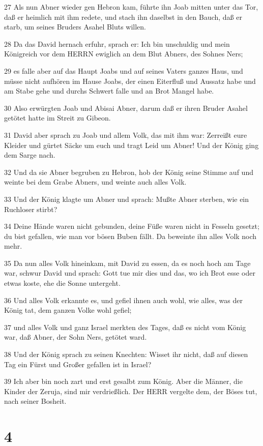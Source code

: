 \par 27 Als nun Abner wieder gen Hebron kam, führte ihn Joab mitten unter das Tor, daß er heimlich mit ihm redete, und stach ihn daselbst in den Bauch, daß er starb, um seines Bruders Asahel Bluts willen.
\par 28 Da das David hernach erfuhr, sprach er: Ich bin unschuldig und mein Königreich vor dem HERRN ewiglich an dem Blut Abners, des Sohnes Ners;
\par 29 es falle aber auf das Haupt Joabs und auf seines Vaters ganzes Haus, und müsse nicht aufhören im Hause Joabs, der einen Eiterfluß und Aussatz habe und am Stabe gehe und durchs Schwert falle und an Brot Mangel habe.
\par 30 Also erwürgten Joab und Abisai Abner, darum daß er ihren Bruder Asahel getötet hatte im Streit zu Gibeon.
\par 31 David aber sprach zu Joab und allem Volk, das mit ihm war: Zerreißt eure Kleider und gürtet Säcke um euch und tragt Leid um Abner! Und der König ging dem Sarge nach.
\par 32 Und da sie Abner begruben zu Hebron, hob der König seine Stimme auf und weinte bei dem Grabe Abners, und weinte auch alles Volk.
\par 33 Und der König klagte um Abner und sprach: Mußte Abner sterben, wie ein Ruchloser stirbt?
\par 34 Deine Hände waren nicht gebunden, deine Füße waren nicht in Fesseln gesetzt; du bist gefallen, wie man vor bösen Buben fällt. Da beweinte ihn alles Volk noch mehr.
\par 35 Da nun alles Volk hineinkam, mit David zu essen, da es noch hoch am Tage war, schwur David und sprach: Gott tue mir dies und das, wo ich Brot esse oder etwas koste, ehe die Sonne untergeht.
\par 36 Und alles Volk erkannte es, und gefiel ihnen auch wohl, wie alles, was der König tat, dem ganzen Volke wohl gefiel;
\par 37 und alles Volk und ganz Israel merkten des Tages, daß es nicht vom König war, daß Abner, der Sohn Ners, getötet ward.
\par 38 Und der König sprach zu seinen Knechten: Wisset ihr nicht, daß auf diesen Tag ein Fürst und Großer gefallen ist in Israel?
\par 39 Ich aber bin noch zart und erst gesalbt zum König. Aber die Männer, die Kinder der Zeruja, sind mir verdrießlich. Der HERR vergelte dem, der Böses tut, nach seiner Bosheit.

\chapter{4}

